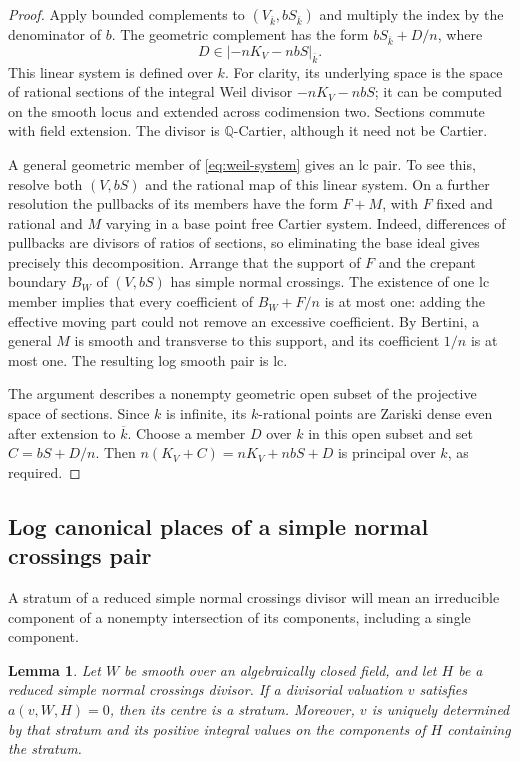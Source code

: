 \documentclass[11pt]{article}
\numberwithin{equation}{section}
\newtheorem{lemma}[theorem]{Lemma}
\theoremstyle{definition}
\newcommand{\Q}{\mathbb Q}
\newcommand{\kb}{\overline{k}}
\begin{document}
\begin{proof}
Apply bounded complements to $(V_{\kb},bS_{\kb})$ and multiply the index
by the denominator of $b$. The geometric complement has the form
$bS_{\kb}+D/n$, where
\begin{equation}\label{eq:weil-system}
 D\in|-nK_V-nbS|_{\kb}.
\end{equation}
This linear system is defined over $k$. For clarity, its underlying
space is the space of rational sections of the integral Weil divisor
$-nK_V-nbS$; it can be computed on the smooth locus and extended across
codimension two. Sections commute with field extension. The divisor
is $\Q$-Cartier, although it need not be Cartier.

A general geometric member of \eqref{eq:weil-system} gives an lc pair.
To see this, resolve both $(V,bS)$ and the rational map of this linear
system. On a further resolution the pullbacks of its members have the
form $F+M$, with $F$ fixed and rational and $M$ varying in a base point
free Cartier system. Indeed, differences of pullbacks are divisors of
ratios of sections, so eliminating the base ideal gives precisely this
decomposition. Arrange that the support of $F$ and the crepant boundary
$B_W$ of $(V,bS)$ has simple normal crossings. The existence of one lc
member implies that every coefficient of $B_W+F/n$ is at most one:
adding the effective moving part could not remove an excessive
coefficient. By Bertini, a general $M$ is smooth and transverse to this
support, and its coefficient $1/n$ is at most one. The resulting log
smooth pair is lc.

The argument describes a nonempty geometric open subset of the
projective space of sections. Since $k$ is infinite, its $k$-rational
points are Zariski dense even after extension to $\kb$. Choose a member
$D$ over $k$ in this open subset and set $C=bS+D/n$. Then
$n(K_V+C)=nK_V+nbS+D$ is principal over $k$, as required.
\end{proof}

\subsection{Log canonical places of a simple normal crossings pair}

A stratum of a reduced simple normal crossings divisor will mean an
irreducible component of a nonempty intersection of its components,
including a single component.

\begin{lemma}\label{lem:weights}
Let $W$ be smooth over an algebraically closed field, and let $H$ be a
reduced simple normal crossings divisor. If a divisorial valuation $v$
satisfies $a(v,W,H)=0$, then its centre is a stratum. Moreover, $v$ is
uniquely determined by that stratum and its positive integral values on
the components of $H$ containing the stratum.
\end{lemma}
\end{document}
